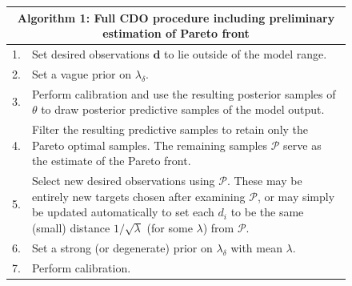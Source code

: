 \documentclass[12pt]{article}
\begin{document}
\begin{figure}
\centering
\begin{tabular}{|l|p{5.5in}|}
\hline
\multicolumn{2}{|c|}{Algorithm 1: Full CDO procedure including preliminary estimation of Pareto front}\\
\hline
1.&Set desired observations $\mathbf d$ to lie outside of the model range.\\
2.&  Set a vague prior on $\lambda_\delta$.\\
3.&  Perform calibration and use the resulting posterior samples of $\theta$ to draw posterior predictive samples of the model output.\\
4.&  Filter the resulting predictive samples to retain only the Pareto optimal samples. The remaining samples $\mathcal P$ serve as the estimate of the Pareto front.\\
5.& Select new desired observations using $\mathcal P$. These may be entirely new targets chosen after examining $\mathcal P$, or may simply be updated automatically to set each $d_i$ to be the same (small) distance $1/\sqrt{\lambda}$ (for some $\lambda$) from $\mathcal P$.\\
6.& Set a strong (or degenerate) prior on $\lambda_\delta$ with mean $\lambda$.\\
7.& Perform calibration.\\
\hline
\end{tabular}
\label{alg:CDO_alg}
\end{figure}
\end{document}
